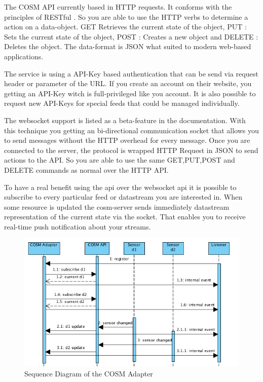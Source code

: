 \documentclass{acm_proc_article-sp}
\begin{document}
The COSM API currently based in HTTP requests. It conforms with the principles of RESTful . So you are able to use the HTTP verbs to determine a action on a data-object.
GET Retrieves the current state of the object,
PUT : Sets the current state of the object,
POST : Creates a new object and DELETE : Deletes the object.
The data-format is JSON what suited to modern web-based applications.

The service is using a API-Key based authentication that can be send via request header or parameter of the URL. If you create an account on their website, you getting an API-Key witch is full-privileged like you account. It is also possible to request new API-Keys for special feeds that could be managed individually.

The websocket support is listed as a beta-feature in the documentation. With this technique you getting an bi-directional communication socket that allows you to send messages without the HTTP overhead for every message.
Once you are connected to the server, the protocol is wrapped HTTP Request in JSON to send actions to the API. So you are able to use the same GET,PUT,POST and DELETE commands as normal over the HTTP API.

To have a real benefit using the api over the websocket api it is possible to subscribe to every particular feed or datastream you are interested in. When some resource is updated the cosm-server sends immediately datastream representation of the current state via the socket. That enables you to receive real-time push notification about your streams.


\begin{figure}[h]
	\begin{center}
		\includegraphics[scale=0.4]{sequence-diagram-cosm.png}
		\caption[Sequence Diagram of the COSM Adapter]{Sequence Diagram of the COSM Adapter}
		\label{fig:SequenceDiagram}
	\end{center}
\end{figure}
\end{document}
